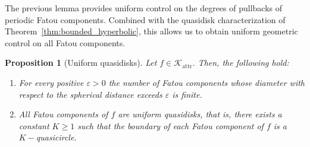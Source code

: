 \documentclass[11pt,a4paper, oneside]{amsart}
\newtheorem{prop}[thm]{Proposition}
\theoremstyle{definition}
\theoremstyle{remark}
\numberwithin{equation}{section}
\renewcommand{\geq}{\geqslant}
\renewcommand{\epsilon}{\varepsilon}
\newcommand{\attr}{{\text{attr}}}
\begin{document}
The previous lemma provides uniform control on the degrees of pullbacks of periodic Fatou components. Combined with the quasidisk characterization of Theorem~\ref{thm:bounded_hyperbolic}, this allows us to obtain uniform geometric control on all Fatou components.

\begin{prop}[Uniform quasidisks] 
	\label{Prop:4David}
	Let $f\in \mathscr K_\attr$. Then, the following hold:
	\begin{enumerate}[leftmargin=8mm]
		\item \label{item:bounded_diam} For every positive $\epsilon>0$ the number of Fatou components whose diameter with respect to the spherical distance exceeds $\epsilon$ is finite.
		\item \label{item:uniform_qdisks} All Fatou components of $f$ are \textit{uniform quasidisks}, that is, there exists a constant $K\geq 1$ such that the boundary of each Fatou component of $f$ is a $K-$quasicircle.
	\end{enumerate}		
\end{prop}
\end{document}
